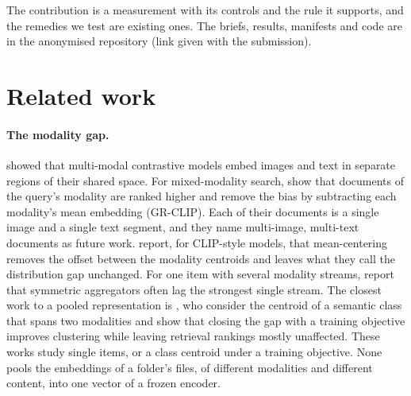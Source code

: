 \documentclass[sigconf,natbib=true,anonymous=true]{acmart}
\newcommand{\anonrepo}{the anonymised repository (link given with the submission)}
\begin{document}
The contribution is a measurement with its controls and the rule it supports, and the remedies we test are existing ones. The briefs, results, manifests and code are in \anonrepo.

\section{Related work}
\label{sec:related}

\paragraph{The modality gap.} \citet{liang2022mindgap} showed that multi-modal contrastive models embed images and text in separate regions of their shared space. For mixed-modality search, \citet{li2025grclip} show that documents of the query's modality are ranked higher and remove the bias by subtracting each modality's mean embedding (GR-CLIP). Each of their documents is a single image and a single text segment, and they name multi-image, multi-text documents as future work. \citet{liu2026geometry} report, for CLIP-style models, that mean-centering removes the offset between the modality centroids and leaves what they call the distribution gap unchanged. For one item with several modality streams, \citet{mehrish2026centroid} report that symmetric aggregators often lag the strongest single stream. The closest work to a pooled representation is \citet{grassucci2026closing}, who consider the centroid of a semantic class that spans two modalities and show that closing the gap with a training objective improves clustering while leaving retrieval rankings mostly unaffected. These works study single items, or a class centroid under a training objective. None pools the embeddings of a folder's files, of different modalities and different content, into one vector of a frozen encoder.
\end{document}
